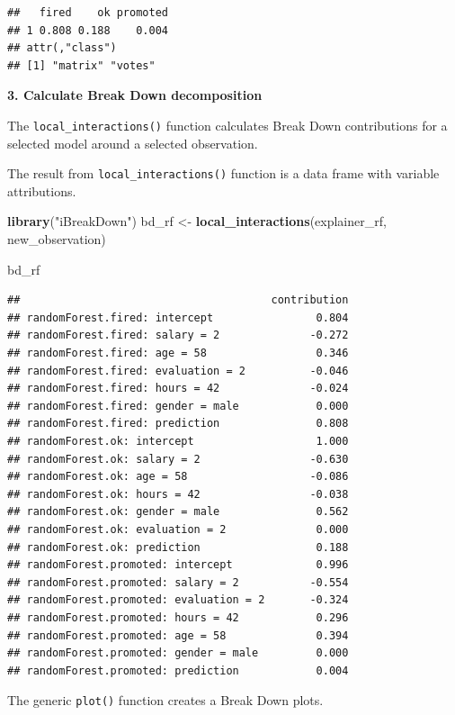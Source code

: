 \documentclass[]{krantz}
\newenvironment{Shaded}{\begin{snugshade}}{\end{snugshade}}
\newcommand{\KeywordTok}[1]{\textcolor[rgb]{0.13,0.29,0.53}{\textbf{#1}}}
\newcommand{\NormalTok}[1]{#1}
\newcommand{\StringTok}[1]{\textcolor[rgb]{0.31,0.60,0.02}{#1}}
\theoremstyle{definition}
\theoremstyle{definition}
\theoremstyle{definition}
\theoremstyle{remark}
\begin{document}
\begin{verbatim}
##   fired    ok promoted
## 1 0.808 0.188    0.004
## attr(,"class")
## [1] "matrix" "votes"
\end{verbatim}

\textbf{3. Calculate Break Down decomposition}

The \texttt{local\_interactions()} function calculates Break Down
contributions for a selected model around a selected observation.

The result from \texttt{local\_interactions()} function is a data frame
with variable attributions.

\begin{Shaded}
\begin{Highlighting}[]
\KeywordTok{library}\NormalTok{(}\StringTok{"iBreakDown"}\NormalTok{)}
\NormalTok{bd_rf <-}\StringTok{ }\KeywordTok{local_interactions}\NormalTok{(explainer_rf,}
\NormalTok{                 new_observation)}

\NormalTok{bd_rf}
\end{Highlighting}
\end{Shaded}

\begin{verbatim}
##                                       contribution
## randomForest.fired: intercept                0.804
## randomForest.fired: salary = 2              -0.272
## randomForest.fired: age = 58                 0.346
## randomForest.fired: evaluation = 2          -0.046
## randomForest.fired: hours = 42              -0.024
## randomForest.fired: gender = male            0.000
## randomForest.fired: prediction               0.808
## randomForest.ok: intercept                   1.000
## randomForest.ok: salary = 2                 -0.630
## randomForest.ok: age = 58                   -0.086
## randomForest.ok: hours = 42                 -0.038
## randomForest.ok: gender = male               0.562
## randomForest.ok: evaluation = 2              0.000
## randomForest.ok: prediction                  0.188
## randomForest.promoted: intercept             0.996
## randomForest.promoted: salary = 2           -0.554
## randomForest.promoted: evaluation = 2       -0.324
## randomForest.promoted: hours = 42            0.296
## randomForest.promoted: age = 58              0.394
## randomForest.promoted: gender = male         0.000
## randomForest.promoted: prediction            0.004
\end{verbatim}

The generic \texttt{plot()} function creates a Break Down plots.
\end{document}
